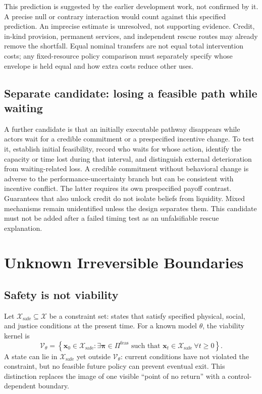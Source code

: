 \documentclass[11pt,a4paper]{article}
\numberwithin{equation}{section}
\theoremstyle{definition}
\theoremstyle{plain}
\theoremstyle{remark}
\newcommand{\safe}{\mathcal{X}_{\mathrm{safe}}}
\newcommand{\policy}{\boldsymbol{\pi}}
\newcommand{\state}{\bm{x}}
\begin{document}
This prediction is suggested by the earlier development work, not confirmed by it. A precise null or contrary interaction would count against this specified prediction. An imprecise estimate is unresolved, not supporting evidence. Credit, in-kind provision, permanent services, and independent rescue routes may already remove the shortfall. Equal nominal transfers are not equal total intervention costs; any fixed-resource policy comparison must separately specify whose envelope is held equal and how extra costs reduce other uses.

\subsection{Separate candidate: losing a feasible path while waiting}

A further candidate is that an initially executable pathway disappears while actors wait for a credible commitment or a prespecified incentive change. To test it, establish initial feasibility, record who waits for whose action, identify the capacity or time lost during that interval, and distinguish external deterioration from waiting-related loss. A credible commitment without behavioral change is adverse to the performance-uncertainty branch but can be consistent with incentive conflict. The latter requires its own prespecified payoff contrast. Guarantees that also unlock credit do not isolate beliefs from liquidity. Mixed mechanisms remain unidentified unless the design separates them. This candidate must not be added after a failed timing test as an unfalsifiable rescue explanation.

\section{Unknown Irreversible Boundaries}

\subsection{Safety is not viability}

Let $\safe\subseteq\mathcal X$ be a constraint set: states that satisfy specified physical, social, and justice conditions at the present time. For a known model $\theta$, the viability kernel is
\begin{equation}
\mathcal V_{\theta}=
\left\{
\state_0\in\safe:
\exists\policy\in\Pi^{\mathrm{feas}}
\text{ such that }
\state_t\in\safe\ \forall t\ge0
\right\}.
\label{eq:viability}
\end{equation}
A state can lie in $\safe$ yet outside $\mathcal V_{\theta}$: current conditions have not violated the constraint, but no feasible future policy can prevent eventual exit. This distinction replaces the image of one visible ``point of no return'' with a control-dependent boundary.
\end{document}
